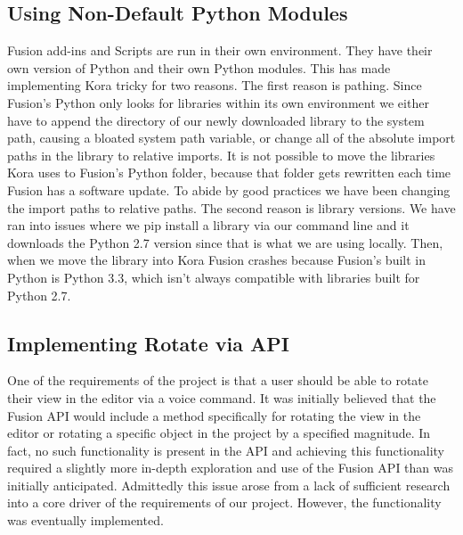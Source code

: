 \documentclass[onecolumn, draftclsnofoot,10pt, compsoc]{IEEEtran}
\begin{document}
	\subsection{Using Non-Default Python Modules}
		Fusion add-ins and Scripts are run in their own environment.
		They have their own version of Python and their own Python modules.
		This has made implementing Kora tricky for two reasons.
		The first reason is pathing.
		Since Fusion's Python only looks for libraries within its own environment we either have to append the directory of our newly downloaded library to the system path, causing a bloated system path variable, or change all of the absolute import paths in the library to relative imports.
		It is not possible to move the libraries Kora uses to Fusion's Python folder, because that folder gets rewritten each time Fusion has a software update.
		To abide by good practices we have been changing the import paths to relative paths.
		The second reason is library versions.
		We have ran into issues where we pip install a library via our command line and it downloads the Python 2.7 version since that is what we are using locally.
		Then, when we move the library into Kora Fusion crashes because Fusion's built in Python is Python 3.3, which isn't always compatible with libraries built for Python 2.7.

	\subsection{Implementing Rotate via API}
		One of the requirements of the project is that a user should be able to rotate their view in the editor via a voice command.
		It was initially believed that the Fusion API would include a method specifically for rotating the view in the editor or rotating a specific object in the project by a specified magnitude.
		In fact, no such functionality is present in the API and achieving this functionality required a slightly more in-depth exploration and use of the Fusion API than was initially anticipated.
		Admittedly this issue arose from a lack of sufficient research into a core driver of the requirements of our project.
		However, the functionality was eventually implemented.
\end{document}
